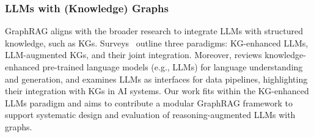\subsubsection{LLMs with (Knowledge) Graphs}
GraphRAG aligns with the broader research to integrate LLMs with structured knowledge, such as KGs. Surveys~\cite{LLM_KG_Roadmap, LLM_KG_Trend} outline three paradigms: KG-enhanced LLMs, LLM-augmented KGs, and their joint integration.
Moreover, \cite{SurveyKPLM} reviews knowledge-enhanced pre-trained language models (e.g., LLMs) for language understanding and generation, and \cite{LLM_interface} examines LLMs as interfaces for data pipelines, highlighting their integration with KGs in AI systems.
Our work fits within the KG-enhanced LLMs paradigm and aims to contribute a modular GraphRAG framework to support systematic design and evaluation of reasoning-augmented LLMs with graphs.



